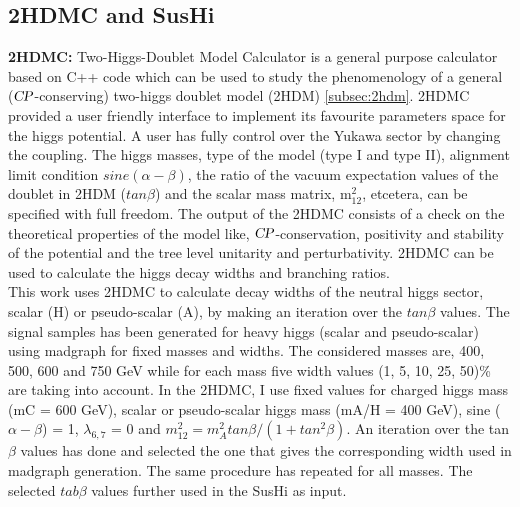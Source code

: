 \subsection{2HDMC and SusHi}\label{subsec:sushi}
\textbf{2HDMC:} Two-Higgs-Doublet Model Calculator \cite{2hdmc} is a general purpose calculator based on C++ code which can be used to study the phenomenology of a general ($\textsl{CP}$-conserving) two-higgs doublet model (2HDM) \ref{subsec:2hdm}. 2HDMC provided a user friendly interface to implement its favourite parameters space for the higgs potential. A user has fully control over the Yukawa sector by changing the coupling. The higgs masses, type of the model (type I and type II), alignment limit condition $sine (\alpha - \beta)$, the ratio of the vacuum expectation values of the doublet in 2HDM ($tan\beta$) and the scalar mass matrix, m$^{2}_{12}$, etcetera, can be specified with full freedom. The output of the 2HDMC consists of a check on the theoretical properties of the model like, $\textsl{CP}$-conservation, positivity and stability of the potential and the tree level unitarity and perturbativity. 2HDMC can be used to calculate the higgs decay widths and branching ratios.\\
This work uses 2HDMC to calculate decay widths of the neutral higgs sector, scalar (H) or pseudo-scalar (A), by making an iteration over the $tan\beta$ values. The signal samples has been generated for heavy higgs (scalar and pseudo-scalar) using madgraph for fixed masses and widths. The considered masses are, 400, 500, 600 and 750 GeV while for each mass five width values (1, 5, 10, 25, 50)\% are taking into account. In the 2HDMC, I use fixed values for charged higgs mass (mC = 600 GeV), scalar or pseudo-scalar higgs mass (mA/H = 400 GeV), sine ($\alpha - \beta$) = 1, $\lambda_{6,7}$ = 0 and $m^{2}_{12} = m^{2}_{A}tan\beta/(1 + tan^{2}\beta)$. An iteration over the tan$\beta$ values has done and selected the one that gives the corresponding width used in madgraph generation. The same procedure has repeated for all masses. The selected $tab\beta$ values further used in the SusHi as input.\\    

